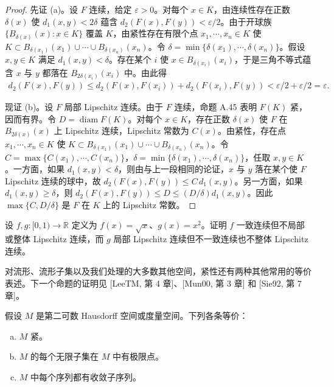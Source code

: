 \documentclass[../../main.tex]{subfiles}
\begin{document}
\begin{proof}
先证 (a)。设 $F$ 连续，给定 $\varepsilon>0$。对每个 $x\in K$，由连续性存在正数 $\delta(x)$ 使 $d_1(x,y)<2\delta$ 蕴含 $d_2(F(x),F(y))<\varepsilon/2$。由于开球族 $\{B_{\delta(x)}(x):x\in K\}$ 覆盖 $K$，由紧性存在有限个点 $x_1,\cdots ,x_n\in K$ 使 $K\subset B_{\delta(x_1)}(x_1)\cup\cdots\cup B_{\delta(x_n)}(x_n)$。令 $\delta=\min\{\delta(x_1),\cdots ,\delta(x_n)\}$。假设 $x,y\in K$ 满足 $d_1(x,y)<\delta$。存在某个 $i$ 使 $x\in B_{\delta(x_i)}(x_i)$，于是三角不等式蕴含 $x$ 与 $y$ 都落在 $B_{2\delta(x_i)}(x_i)$ 中。由此得
\begin{align*}
d_2(F(x),F(y))\leqslant d_2(F(x),F(x_i))+d_2(F(x_i),F(y))
<\varepsilon/2+\varepsilon/2=\varepsilon.
\end{align*}

现证 (b)。设 $F$ 局部 Lipschitz 连续。由于 $F$ 连续，命题 A.45 表明 $F(K)$ 紧，因而有界。令 $D=\operatorname{diam}F(K)$。对每个 $x\in K$，存在正数 $\delta(x)$ 使 $F$ 在 $B_{2\delta(x)}(x)$ 上 Lipschitz 连续，Lipschitz 常数为 $C(x)$。由紧性，存在点 $x_1,\cdots ,x_n\in K$ 使 $K\subset B_{\delta(x_1)}(x_1)\cup\cdots\cup B_{\delta(x_n)}(x_n)$。令 $C=\max\{C(x_1),\cdots ,C(x_n)\}$，$\delta=\min\{\delta(x_1),\cdots ,\delta(x_n)\}$，任取 $x,y\in K$。一方面，如果 $d_1(x,y)<\delta$，则由与上一段相同的论证，$x$ 与 $y$ 落在某个使 $F$ Lipschitz 连续的球中，故 $d_2(F(x),F(y))\leqslant C\,d_1(x,y)$。另一方面，如果 $d_1(x,y)\geqslant\delta$，则 $d_2(F(x),F(y))\leqslant D\leqslant(D/\delta)d_1(x,y)$。因此 $\max\{C,D/\delta\}$ 是 $F$ 在 $K$ 上的 Lipschitz 常数。
\end{proof}

\begin{exercise}\label{exercise:appA-A-49}
设 $f,g:[0,1)\to\mathbb R$ 定义为 $f(x)=\sqrt{x}$、$g(x)=x^2$。证明 $f$ 一致连续但不局部或整体 Lipschitz 连续，而 $g$ 局部 Lipschitz 连续但不一致连续也不整体 Lipschitz 连续。
\end{exercise}

对流形、流形子集以及我们处理的大多数其他空间，紧性还有两种其他常用的等价表述。下一个命题的证明见 [LeeTM, 第 4 章]、[Mun00, 第 3 章] 和 [Sie92, 第 7 章]。

\begin{proposition}[紧性的等价表述]\label{proposition:appA-compact-equivalents}
假设 $M$ 是第二可数 Hausdorff 空间或度量空间。下列各条等价：
\begin{enumerate}[(a)]
\item $M$ 紧。
\item $M$ 的每个无限子集在 $M$ 中有极限点。
\item $M$ 中每个序列都有收敛子序列。
\end{enumerate}
\end{proposition}
\end{document}

